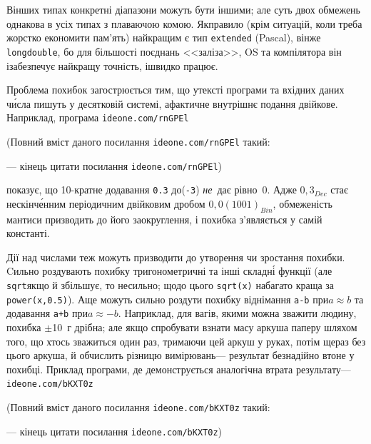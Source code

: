 \documentclass[14pt,a4paper]{extarticle}
\renewcommand{\baselinestretch}{1.3125}
\begin{document}
В\nolinebreak[3] інших типах конкретні діапазони можуть бути іншими; але суть двох обмежень однакова в усіх типах з плаваючою комою. 
Як\nolinebreak[3] правило (крім ситуацій, коли треба жорстко економити пам'ять) найкращим є тип \texttt{extended} (Pascal), він\nolinebreak[3] же \texttt{long\nolinebreak[2] double}, бо для більшості поєднань <<заліза>>, OS та компілятора він і\nolinebreak[3] забезпечує найкращу точність, і\nolinebreak[3] швидко працює. 

Проблема похибок загострюється тим, що у\nolinebreak[3] тексті програми та вхідних даних ч\'{и}сла пишуть у десятковій системі, а\nolinebreak[2] фактичне внутрішнє подання двійкове. 
Наприклад, програма 
\verb"ideone.com/rnGPEl"


{\color{green}\begin{small}

\renewcommand{\baselinestretch}{0.875}

(Повний вміст даного посилання \verb"ideone.com/rnGPEl" такий:

--- кінець цитати посилання \verb"ideone.com/rnGPEl")

\end{small}}


 показує, що 10-\nolinebreak[2]кратне додавання \texttt{0.3} до\nolinebreak[2] (\texttt{-3}) \emph{не}~дає рівно~0. Адже $0{,}3_{Dec}$ стає нескін\-ч\'{е}н\-ним періодичним двійковим дробом $0{,}0(1001)_{Bin}$, обмеженість мантиси призводить до його заокруглення, і похибка з'являється у самій константі.\label{text:floating-point-error-in-0.3}

Дії над числами теж можуть призводити до утворення чи зростання похибки. Cильно роздувають похибку тригонометричні та інші складн\'{і} функції (але \verb"sqrt"\nolinebreak[1] якщо й збільшує, то не\nolinebreak[3] сильно; щодо цього \verb"sqrt(x)" набагато краща за \verb"power(x,0.5)"). А\nolinebreak[3] ще можуть сильно роздути похибку віднімання \verb"a-b" при\nolinebreak[2] ${a{\approx}b}$ та додавання \verb"a+b" при\nolinebreak[3] ${a{\approx}{-}b}$. Наприклад, для вагів, якими можна зважити людину, похибка $\pm$10~г дрібна; але якщо спробувати взнати масу аркуша паперу шляхом того, що хтось зважиться один раз, тримаючи цей аркуш у руках, потім ще\nolinebreak[3] раз без цього аркуша, й обчислить різницю вимірювань\nolinebreak[3] --- результат безнадійно втоне у похибці.
Приклад програми, де демонструється аналогічна втрата результату\nolinebreak[3] --- 
\verb"ideone.com/bKXT0z"


{\color{green}\begin{small}

\renewcommand{\baselinestretch}{0.875}

(Повний вміст даного посилання \verb"ideone.com/bKXT0z" такий:

--- кінець цитати посилання \verb"ideone.com/bKXT0z")

\end{small}}
\end{document}
